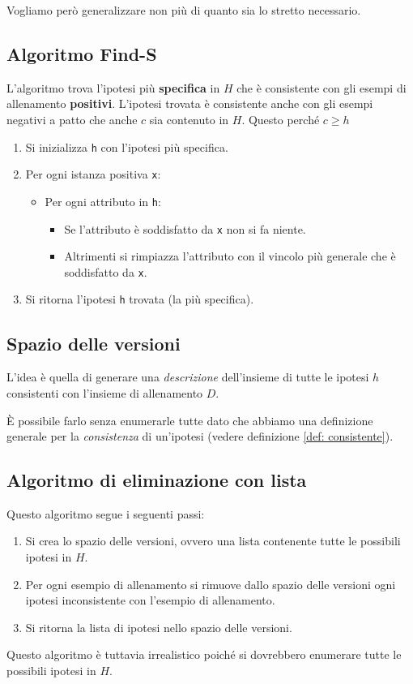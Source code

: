 Vogliamo per\`o generalizzare non pi\`u di quanto sia lo stretto necessario.

\subsection{Algoritmo Find-S}
L'algoritmo trova l'ipotesi pi\`u \textbf{specifica} in $H$ che \`e consistente con gli esempi di allenamento
\textbf{positivi}. L'ipotesi trovata \`e consistente anche con gli esempi negativi a patto che anche $c$ sia
contenuto in $H$. Questo perch\'e $c \geq h$
\begin{enumerate}
	\item Si inizializza \verb|h| con l'ipotesi pi\`u specifica.
	\item Per ogni istanza positiva \verb|x|:
	      \begin{itemize}
		      \item Per ogni attributo in \verb|h|:
		            \begin{itemize}
			            \item Se l'attributo \`e soddisfatto da \verb|x| non si fa niente.
			            \item Altrimenti si rimpiazza l'attributo con il vincolo pi\`u generale che \`e soddisfatto da
			                  \verb|x|.
		            \end{itemize}
	      \end{itemize}
	\item Si ritorna l'ipotesi \verb|h| trovata (la pi\`u specifica).
\end{enumerate}

\subsection{Spazio delle versioni}
L'idea \`e quella di generare una \emph{descrizione} dell'insieme di tutte le ipotesi $h$ consistenti con l'insieme di
allenamento $D$.

\`E possibile farlo senza enumerarle tutte dato che abbiamo una definizione generale per la \emph{consistenza} di
un'ipotesi (vedere definizione \ref{def: consistente}).

\subsection{Algoritmo di eliminazione con lista}
Questo algoritmo segue i seguenti passi:
\begin{enumerate}
	\item Si crea lo spazio delle versioni, ovvero una lista contenente tutte le possibili ipotesi in $H$.
	\item Per ogni esempio di allenamento si rimuove dallo spazio delle versioni ogni ipotesi inconsistente con l'esempio
	      di allenamento.
	\item Si ritorna la lista di ipotesi nello spazio delle versioni.
\end{enumerate}
Questo algoritmo \`e tuttavia irrealistico poich\'e si dovrebbero enumerare tutte le possibili ipotesi in $H$.